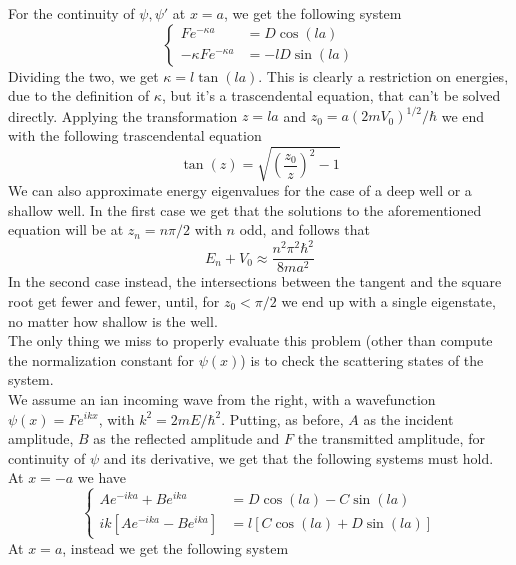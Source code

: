 \documentclass[a4paper, 11pt]{book}
\newcommand{\1}{\opr{\mathds{1}}}
\theoremstyle{plain}
\begin{document}
	For the continuity of $\psi,\psi'$ at $x=a$, we get the following system
	\begin{equation}
		\left\{ \begin{aligned}
				Fe^{-\kappa a}&=D\cos(la)\\
				-\kappa Fe^{-\kappa a}&=-lD\sin(la)
		\end{aligned}\right.
		\label{eq:leftcondition}
	\end{equation}
	Dividing the two, we get $\kappa=l\tan(la)$. This is clearly a restriction on energies, due to the definition of $\kappa$, but it's a trascendental equation, that can't be solved directly. Applying the transformation $z=la$ and $z_0=a(2mV_0)^{1/2}/\hbar$ we end with the following trascendental equation
	\begin{equation}
		\tan(z)=\sqrt{\left( \frac{z_0}{z} \right)^{2}-1}
		\label{eq:energytranscendental}
	\end{equation}
	We can also approximate energy eigenvalues for the case of a deep well or a shallow well. In the first case we get that the solutions to the aforementioned equation will be at $z_n=n\pi/2$ with $n$ odd, and follows that
	\begin{equation*}
		E_n+V_0\approx\frac{n^2\pi^2\hbar^2}{8ma^2}
	\end{equation*}
	In the second case instead, the intersections between the tangent and the square root get fewer and fewer, until, for $z_0<\pi/2$ we end up with a single eigenstate, no matter how shallow is the well.\\
	The only thing we miss to properly evaluate this problem (other than compute the normalization constant for $\psi(x)$) is to check the scattering states of the system.\\
	We assume an ian incoming wave from the right, with a wavefunction $\psi(x)=Fe^{ikx}$, with $k^2=2mE/\hbar^2$. Putting, as before, $A$ as the incident amplitude, $B$ as the reflected amplitude and $F$ the transmitted amplitude, for continuity of $\psi$ and its derivative, we get that the following systems must hold. At $x=-a$ we have
	\begin{equation}
		\left\{ \begin{aligned}
				Ae^{-ika}+Be^{ika}&=D\cos(la)-C\sin(la)\\
				ik\left[ Ae^{-ika}-Be^{ika} \right]&=l\left[ C\cos(la)+D\sin(la) \right]
		\end{aligned}\right.
		\label{eq:conditionsfinitewell}
	\end{equation}
	At $x=a$, instead we get the following system
\end{document}
